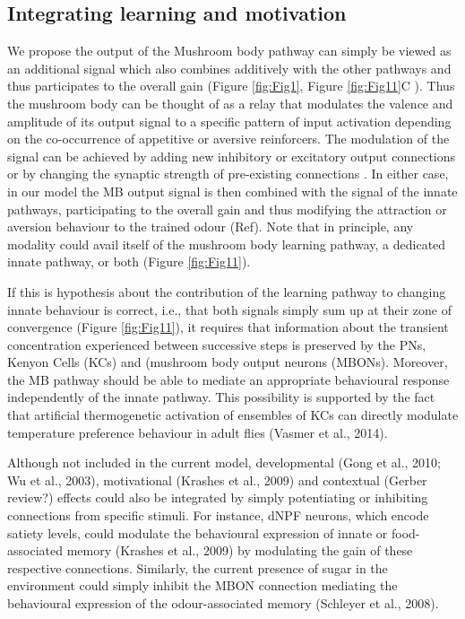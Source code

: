 \documentclass[10pt,a4paper]{article}
\begin{document}
\subsection{Integrating learning and motivation}
We propose the output of the Mushroom body pathway \citep{gerber2004engram} can simply be viewed as an additional signal which also combines additively with the other pathways and thus participates to the overall gain (Figure \ref{fig:Fig1}, Figure \ref{fig:Fig11}C ). Thus the mushroom body can be thought of as a relay that modulates the valence and amplitude of its output signal to a specific pattern of input activation depending on the co-occurrence of appetitive or aversive reinforcers. The modulation of the signal can be achieved by adding new inhibitory or excitatory output connections or by changing the synaptic strength of pre-existing connections \citep{aso2014neuronal}. In either case, in our model the MB output signal is then combined with the signal of the innate pathways, participating to the overall gain and thus modifying the attraction or aversion behaviour to the trained odour (Ref). Note that in principle, any modality could avail itself of the mushroom body learning pathway, a dedicated innate pathway, or both (Figure \ref{fig:Fig11}). 

If this is hypothesis about the contribution of the learning pathway to changing innate behaviour is correct, i.e., that both signals simply sum up at their zone of convergence (Figure \ref{fig:Fig11}), it requires that information about the transient concentration experienced between successive steps is preserved by the PNs, Kenyon Cells (KCs) and (mushroom body output neurons (MBONs). Moreover, the MB pathway should be able to mediate an appropriate behavioural response independently of the innate pathway. This possibility is supported by the fact that artificial thermogenetic activation of ensembles of KCs can directly modulate temperature preference behaviour in adult flies (Vasmer et al., 2014). 

Although not included in the current model, developmental (Gong et al., 2010; Wu et al., 2003), motivational (Krashes et al., 2009) and contextual (Gerber review?) effects could also be integrated by simply potentiating or inhibiting connections from specific stimuli. For instance, dNPF neurons, which encode satiety levels, could modulate the behavioural expression of innate or food-associated memory (Krashes et al., 2009) by modulating the gain of these respective connections. Similarly, the current presence of sugar in the environment could simply inhibit the MBON connection mediating the behavioural expression of the odour-associated memory (Schleyer et al., 2008).
\end{document}
